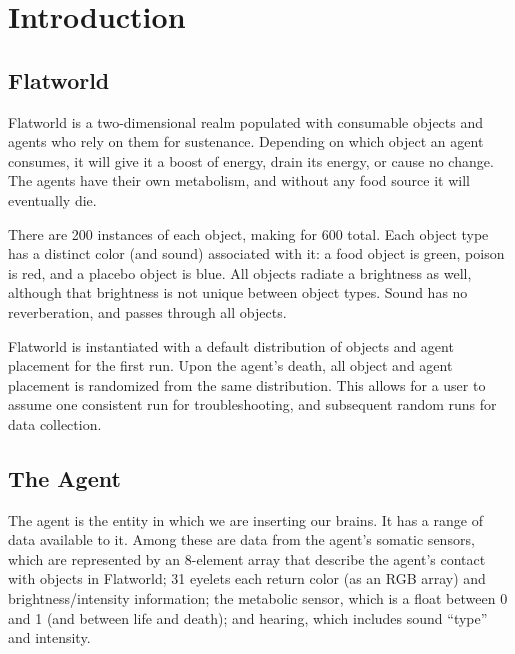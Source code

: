 \section{Introduction} \label{sec:Introduction}



\subsection{Flatworld}
Flatworld is a two-dimensional realm populated with consumable objects
and agents who rely on them for sustenance. Depending on which object
an agent consumes, it will give it a boost of energy, drain its energy,
or cause no change. The agents have their own metabolism, and without any food
source it will eventually die.

There are 200 instances of each object, making for 600 total. Each object type
has a distinct color (and sound) associated with it: a food object is green, 
poison is red, and a placebo object is blue. All objects radiate a brightness 
as well, although that brightness is not unique between object types. Sound 
has no reverberation, and passes through all objects.

Flatworld is instantiated with a default distribution of objects and agent
placement for the first run. Upon the agent's death, all object and agent
placement is randomized from the same distribution. This allows for a user
to assume one consistent run for troubleshooting, and subsequent random
runs for data collection.


\subsection{The Agent}
The agent is the entity in which we are inserting our brains. It has a range
of data available to it. Among these are data from the agent's somatic
sensors, which are represented by an 8-element array that describe the agent's
contact with objects in Flatworld; 31 eyelets each return color (as an RGB 
array) and brightness/intensity information; the metabolic sensor, which
is a float between 0 and 1 (and between life and death); and hearing, which
includes sound ``type'' and intensity.

